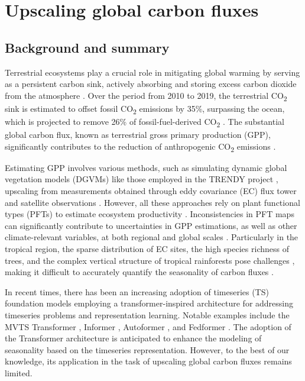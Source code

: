 \section{Upscaling global carbon fluxes} \label{chap6}

\subsection{Background and summary}
Terrestrial ecosystems play a crucial role in mitigating global warming by serving as a persistent carbon sink, actively absorbing and storing excess carbon dioxide from the atmosphere \citep{pan2011large}. Over the period from 2010 to 2019, the terrestrial CO\textsubscript{2} sink is estimated to offset fossil CO\textsubscript{2} emissions by 35\%, surpassing the ocean, which is projected to remove 26\% of fossil-fuel-derived CO\textsubscript{2} \citep{friedlingstein2020global, wang2022disentangling}. The substantial global carbon flux, known as terrestrial gross primary production (GPP), significantly contributes to the reduction of anthropogenic CO\textsubscript{2} emissions \citep{beer2010terrestrial}. \par

Estimating GPP involves various methods, such as simulating dynamic global vegetation models (DGVMs) like those employed in the TRENDY project \citep{sitch2015recent, le2018global}, upscaling from measurements obtained through eddy covariance (EC) flux tower and satellite observations \citep{jung2019fluxcom, zeng2020global}. However, all these approaches rely on plant functional types (PFTs) to estimate ecosystem productivity \citep{poulter2011plant, poulter2015plant, lin2021improved, guo2023estimating, yan2023integrating}. Inconsistencies in PFT maps can significantly contribute to uncertainties in GPP estimations, as well as other climate-relevant variables, at both regional and global scales \citep{poulter2011plant}. Particularly in the tropical region, the sparse distribution of EC sites, the high species richness of trees, and the complex vertical structure of tropical rainforests pose challenges \citep{montgomery2001forest}, making it difficult to accurately quantify the seasonality of carbon fluxes \citep{xu2015satellite}. \par

In recent times, there has been an increasing adoption of timeseries (TS) foundation models employing a transformer-inspired architecture for addressing timeseries problems and representation learning. Notable examples include the MVTS Transformer \citep{zerveas2021transformer}, Informer \citep{zhou2021informer}, Autoformer \citep{wu2021autoformer}, and Fedformer \citep{zhou2022fedformer}. The adoption of the Transformer architecture is anticipated to enhance the modeling of seasonality based on the timeseries representation. However, to the best of our knowledge, its application in the task of upscaling global carbon fluxes remains limited. \par

